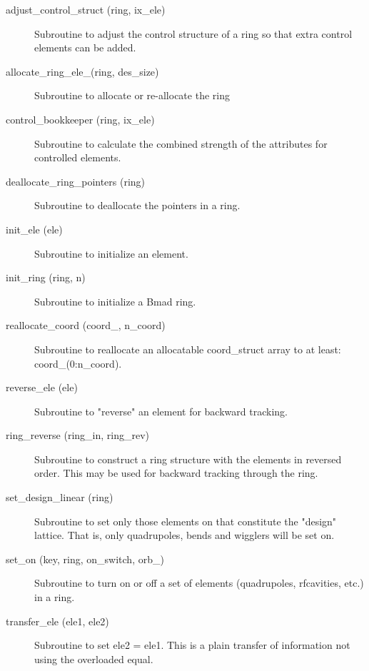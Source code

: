 \begin{description}

\item[adjust\_control\_struct (ring, ix\_ele)] \Newline
Subroutine to adjust the control structure of a ring so that 
extra control elements can be added. 

\item[allocate\_ring\_ele\_(ring, des\_size)] \Newline 
     Subroutine to allocate or re-allocate the ring%

\item[control\_bookkeeper (ring, ix\_ele)] \Newline
Subroutine to calculate the combined strength of the attributes for controlled elements. 

\item[deallocate\_ring\_pointers (ring)] \Newline 
     Subroutine to deallocate the pointers in a ring.

\item[init\_ele (ele)] \Newline
Subroutine to initialize an element. 

\item[init\_ring (ring, n)] \Newline 
     Subroutine to initialize a Bmad ring.

\item[reallocate\_coord (coord\_, n\_coord)] \Newline 
Subroutine to reallocate an allocatable  coord\_struct array to at least:
coord\_(0:n\_coord).

\item[reverse\_ele (ele)] \Newline
Subroutine to "reverse" an element for backward tracking. 

\item[ring\_reverse (ring\_in, ring\_rev)] \Newline
Subroutine to construct a ring structure with the elements in reversed 
order. This may be used for backward tracking through the ring. 

\item[set\_design\_linear (ring)] \Newline
Subroutine to set only those elements on that constitute the "design" 
lattice. That is, only quadrupoles, bends and wigglers will be set on. 

\item[set\_on (key, ring, on\_switch, orb\_)] \Newline
Subroutine to turn on or off a set of elements (quadrupoles, rfcavities, etc.) in a ring. 

\item[transfer\_ele (ele1, ele2)] \Newline 
     Subroutine to set ele2 = ele1. 
     This is a plain transfer of information not using the overloaded equal.


\end{description}
